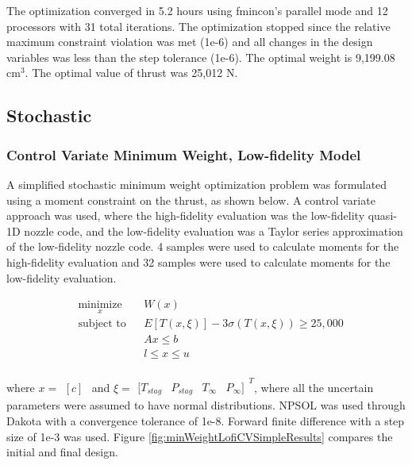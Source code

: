 \documentclass{article}
\newcommand{\irow}[1]{%
  \begin{smallmatrix}[#1]\end{smallmatrix}%
}
\begin{document}
The optimization converged in 5.2 hours using fmincon's parallel mode and 12 processors with 31 total iterations. The optimization stopped since the relative maximum constraint violation was met (1e-6) and all changes in the design variables was less than the step tolerance (1e-6). The optimal weight is 9,199.08 $\textrm{cm}^3$. The optimal value of thrust was 25,012 N. 

\subsection{Stochastic}

\subsubsection{Control Variate Minimum Weight, Low-fidelity Model}

A simplified stochastic minimum weight optimization problem was formulated using a moment constraint on the thrust, as shown below. A control variate approach was used, where the high-fidelity evaluation was the low-fidelity quasi-1D nozzle code, and the low-fidelity evaluation was a Taylor series approximation of the low-fidelity nozzle code. 4 samples were used to calculate moments for the high-fidelity evaluation and 32 samples were used to calculate moments for the low-fidelity evaluation. 
 
\begin{equation}
\label{eq:minWeightCVLowFiSimplified}
\begin{aligned}
& \underset{x}{\text{minimize}}
& & W(x) \\
& \text{subject to}
& & E[T(x,\xi)] - 3 \sigma(T(x,\xi)) \geq 25,000 \\
& & & A x \leq b \\
& & & l \leq x \leq u \\
\end{aligned}
\end{equation}

where $x = \irow{c}$ and $\xi = \irow{ T_{stag} & P_{stag} & T_{\infty} & P_{\infty} }^T$, where all the uncertain parameters were assumed to have normal distributions. NPSOL was used through Dakota with a convergence tolerance of 1e-8. Forward finite difference with a step size of 1e-3 was used. Figure \ref{fig:minWeightLofiCVSimpleResults} compares the initial and final design.
\end{document}
